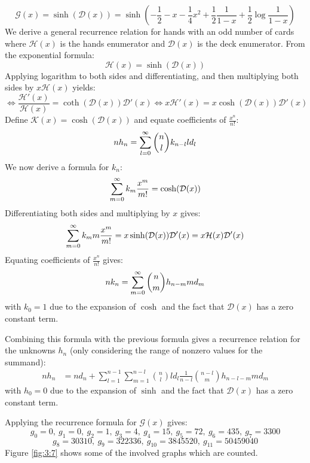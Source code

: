 \begin{solution}
    \[
        \mathcal{G}(x) = \sinh(\mathcal{D}(x)) = \sinh\left(-\frac{1}{2} - x - \frac{1}{4}x^2 + \frac{1}{2}\frac{1}{1-x} + \frac{1}{2}\log\frac{1}{1-x}\right)
    \]
    We derive a general recurrence relation for hands with an odd number of cards where $\mathcal{H}(x)$ is the hands enumerator and $\mathcal{D}(x)$ is the deck enumerator. From the exponential formula:
    \[
        \mathcal{H}(x) = \sinh(\mathcal{D}(x))
    \]
    Applying logarithm to both sides and differentiating, and then multiplying both sides by $x\mathcal{H}(x)$ yields:
    \[
        \Longleftrightarrow \frac{\mathcal{H}'(x)}{\mathcal{H}(x)} = \coth(\mathcal{D}(x))\mathcal{D}'(x) \Longleftrightarrow x\mathcal{H}'(x) = x\cosh(\mathcal{D}(x))\mathcal{D}'(x)
    \]
    Define $\mathcal{K}(x) = \cosh(\mathcal{D}(x))$ and equate coefficients of $\frac{x^n}{n!}$:
    \[
        nh_n = \bsum[l]\binom{n}{l}k_{n-l}ld_{l}
    \]
    We now derive a formula for $k_n$:
    \[
        \bsum[m] k_m \frac{x^m}{m!} = \cosh(\mathcal{D}(x))
    \]
    Differentiating both sides and multiplying by $x$ gives:
    \[
        \bsum[m] k_m m \frac{x^m}{m!} = x\sinh(\mathcal{D}(x))\mathcal{D}'(x) = x\mathcal{H}(x)\mathcal{D}'(x)
    \]
    Equating coefficients of $\frac{x^n}{n!}$ gives:
    \[
        nk_n = \bsum[m] \binom{n}{m} h_{n-m}md_m 
    \]
    with $k_0 = 1$ due to the expansion of $\cosh$ and the fact that $\mathcal{D}(x)$ has a zero constant term.

    Combining this formula with the previous formula gives a recurrence relation for the unknowns $h_n$ (only considering the range of nonzero values for the summand):
    \begin{align*}
        nh_n &= nd_n + \sum_{l=1}^{n-1} \sum_{m=1}^{n-l} \binom{n}{l}ld_l \frac{1}{n-l}\binom{n-l}{m}h_{n-l-m}md_m
    \end{align*}
    with $h_0 = 0$ due to the expansion of $\sinh$ and the fact that $\mathcal{D}(x)$ has a zero constant term.

    Applying the recurrence formula for $\mathcal{G}(x)$ gives:
    \[
        g_0 = 0,\ g_1 = 0,\ g_2 = 1,\ g_3 = 4,\ g_4 = 15,\ g_5 = 72,\ g_6 = 435,\ g_7 = 3300
    \]
    \[
        g_8 = 30310,\ g_9 = 322336,\ g_{10} = 3845520,\ g_{11} = 50459040
    \]
    Figure \ref{fig:3:7} shows some of the involved graphs which are counted.
    \begin{figure}[hbpt]
    \centering
\end{figure}
\end{solution}
